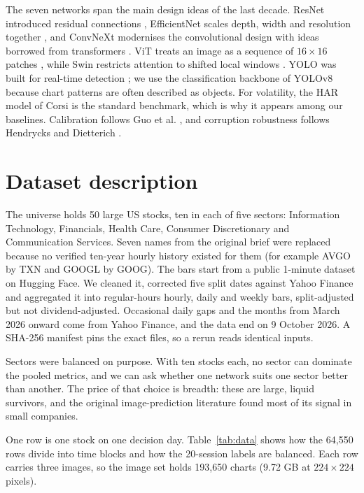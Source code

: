 \documentclass[11pt,a4paper]{article}
\begin{document}
The seven networks span the main design ideas of the last decade. ResNet introduced residual connections \cite{he2016}, EfficientNet scales depth, width and resolution together \cite{tan2019}, and ConvNeXt modernises the convolutional design with ideas borrowed from transformers \cite{liu2022convnext}. ViT treats an image as a sequence of $16\times16$ patches \cite{dosovitskiy2021}, while Swin restricts attention to shifted local windows \cite{liu2021swin}. YOLO was built for real-time detection \cite{redmon2016}; we use the classification backbone of YOLOv8 \cite{jocher2023} because chart patterns are often described as objects. For volatility, the HAR model of Corsi \cite{corsi2009} is the standard benchmark, which is why it appears among our baselines. Calibration follows Guo et al. \cite{guo2017}, and corruption robustness follows Hendrycks and Dietterich \cite{hendrycks2019}.

\section{Dataset description}

The universe holds 50 large US stocks, ten in each of five sectors: Information Technology, Financials, Health Care, Consumer Discretionary and Communication Services. Seven names from the original brief were replaced because no verified ten-year hourly history existed for them (for example AVGO by TXN and GOOGL by GOOG). The bars start from a public 1-minute dataset on Hugging Face. We cleaned it, corrected five split dates against Yahoo Finance and aggregated it into regular-hours hourly, daily and weekly bars, split-adjusted but not dividend-adjusted. Occasional daily gaps and the months from March 2026 onward come from Yahoo Finance, and the data end on 9 October 2026. A SHA-256 manifest pins the exact files, so a rerun reads identical inputs.

Sectors were balanced on purpose. With ten stocks each, no sector can dominate the pooled metrics, and we can ask whether one network suits one sector better than another. The price of that choice is breadth: these are large, liquid survivors, and the original image-prediction literature found most of its signal in small companies.

One row is one stock on one decision day. Table~\ref{tab:data} shows how the 64,550 rows divide into time blocks and how the 20-session labels are balanced. Each row carries three images, so the image set holds 193,650 charts (9.72 GB at $224\times224$ pixels).
\end{document}
